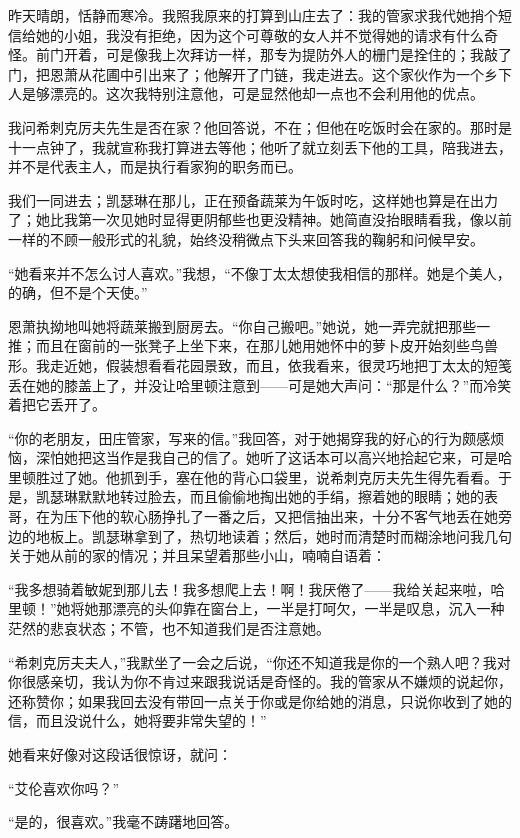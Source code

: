 \par 昨天晴朗，恬静而寒冷。我照我原来的打算到山庄去了：我的管家求我代她捎个短信给她的小姐，我没有拒绝，因为这个可尊敬的女人并不觉得她的请求有什么奇怪。前门开着，可是像我上次拜访一样，那专为提防外人的栅门是拴住的；我敲了门，把恩萧从花圃中引出来了；他解开了门链，我走进去。这个家伙作为一个乡下人是够漂亮的。这次我特别注意他，可是显然他却一点也不会利用他的优点。
\par 我问希刺克厉夫先生是否在家？他回答说，不在；但他在吃饭时会在家的。那时是十一点钟了，我就宣称我打算进去等他；他听了就立刻丢下他的工具，陪我进去，并不是代表主人，而是执行看家狗的职务而已。
\par 我们一同进去；凯瑟琳在那儿，正在预备蔬莱为午饭时吃，这样她也算是在出力了；她比我第一次见她时显得更阴郁些也更没精神。她简直没抬眼睛看我，像以前一样的不顾一般形式的礼貌，始终没稍微点下头来回答我的鞠躬和问候早安。
\par “她看来并不怎么讨人喜欢。”我想，“不像丁太太想使我相信的那样。她是个美人，的确，但不是个天使。”
\par 恩萧执拗地叫她将蔬莱搬到厨房去。“你自己搬吧。”她说，她一弄完就把那些一推；而且在窗前的一张凳子上坐下来，在那儿她用她怀中的萝卜皮开始刻些鸟兽形。我走近她，假装想看看花园景致，而且，依我看来，很灵巧地把丁太太的短笺丢在她的膝盖上了，并没让哈里顿注意到——可是她大声问：“那是什么？”而冷笑着把它丢开了。
\par “你的老朋友，田庄管家，写来的信。”我回答，对于她揭穿我的好心的行为颇感烦恼，深怕她把这当作是我自己的信了。她听了这话本可以高兴地拾起它来，可是哈里顿胜过了她。他抓到手，塞在他的背心口袋里，说希刺克厉夫先生得先看看。于是，凯瑟琳默默地转过脸去，而且偷偷地掏出她的手绢，擦着她的眼睛；她的表哥，在为压下他的软心肠挣扎了一番之后，又把信抽出来，十分不客气地丢在她旁边的地板上。凯瑟琳拿到了，热切地读着；然后，她时而清楚时而糊涂地问我几句关于她从前的家的情况；并且呆望着那些小山，喃喃自语着：
\par “我多想骑着敏妮到那儿去！我多想爬上去！啊！我厌倦了——我给关起来啦，哈里顿！”她将她那漂亮的头仰靠在窗台上，一半是打呵欠，一半是叹息，沉入一种茫然的悲哀状态；不管，也不知道我们是否注意她。
\par “希刺克厉夫夫人，”我默坐了一会之后说，“你还不知道我是你的一个熟人吧？我对你很感亲切，我认为你不肯过来跟我说话是奇怪的。我的管家从不嫌烦的说起你，还称赞你；如果我回去没有带回一点关于你或是你给她的消息，只说你收到了她的信，而且没说什么，她将要非常失望的！”
\par 她看来好像对这段话很惊讶，就问：
\par “艾伦喜欢你吗？”
\par “是的，很喜欢。”我毫不踌躇地回答。
